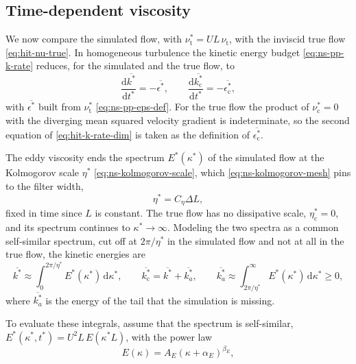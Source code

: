 \documentclass{article}
\begin{document}
\subsection{Time-dependent viscosity}\label{ssec:hit-viscosity}
We now compare the simulated flow, with $\nu_{\mathrm{t}}^* = UL\, \nu_{\mathrm{t}}$,
with the inviscid true flow \eqref{eq:hit-nu-true}. In homogeneous turbulence
the kinetic energy budget \eqref{eq:ns-pp-k-rate} reduces, for the simulated
and the true flow, to
\begin{equation}\label{eq:hit-k-rate-dim}
  \frac{\mathrm{d} \overline{k^*}}{\mathrm{d} t^*} = -\overline{\epsilon^*},
  \qquad
  \frac{\mathrm{d} \overline{k_{\mathrm{c}}^*}}{\mathrm{d} t^*} = -\overline{\epsilon_{\mathrm{c}}^*},
\end{equation}
with $\overline{\epsilon^*}$ built from $\nu_{\mathrm{t}}^*$
\eqref{eq:ns-pp-eps-def}. For the true flow the product of
$\nu_{\mathrm{c}}^* = 0$ with the diverging mean squared velocity gradient is
indeterminate, so the second equation of \eqref{eq:hit-k-rate-dim} is taken as
the definition of $\overline{\epsilon_{\mathrm{c}}^*}$.
\par
The eddy viscosity ends the spectrum $E^*(\kappa^*)$ of the simulated flow at
the Kolmogorov scale $\eta^*$ \eqref{eq:ns-kolmogorov-scale}, which
\eqref{eq:ns-kolmogorov-mesh} pins to the filter width,
\begin{equation}\label{eq:hit-eta}
  \eta^* = C_\eta \Delta L ,
\end{equation}
fixed in time since $L$ is constant. The true flow has no dissipative scale,
$\eta_{\mathrm{c}}^* = 0$, and its spectrum continues to
$\kappa^* \to \infty$. Modeling the two spectra as a common self-similar
spectrum, cut off at $2\pi/\eta^*$ in the simulated flow and not at all in the
true flow, the kinetic energies are
\begin{equation}\label{eq:hit-k-split}
  \overline{k^*} \approx \int_0^{2\pi/\eta^*} E^*(\kappa^*)\, \mathrm{d}\kappa^*,
  \qquad
  \overline{k_{\mathrm{c}}^*} = \overline{k^*} + \overline{k_a^*},
  \qquad
  \overline{k_a^*} \approx \int_{2\pi/\eta^*}^{\infty} E^*(\kappa^*)\, \mathrm{d}\kappa^* \ge 0 ,
\end{equation}
where $\overline{k_a^*}$ is the energy of the tail that the simulation is missing.
\par
To evaluate these integrals, assume that the spectrum is self-similar,
$E^*(\kappa^*, t^*) = U^2 L\, E(\kappa^* L)$, with the power law
\begin{equation}\label{eq:hit-E-powerlaw}
  E(\kappa) = A_E (\kappa + \alpha_E)^{\beta_E},
\end{equation}
\end{document}
